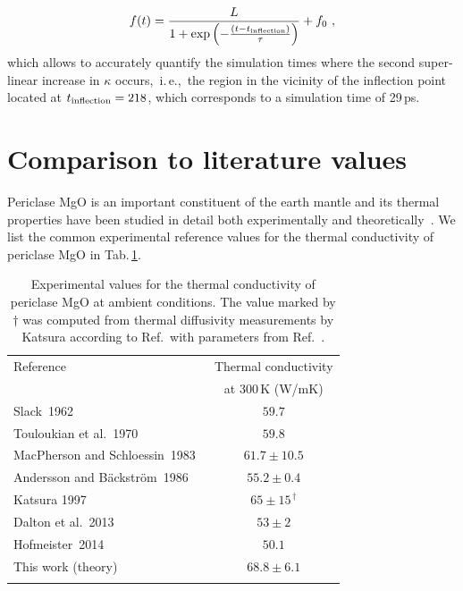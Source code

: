 \begin{align}
	f(t) 
		= \frac{L}{1 + \exp \left(-\frac{(t-t_{\rm inflection})}{\tau} \right)} + f_0~,
	\label{eq:imp.f_logistic}
\end{align}
which allows to accurately quantify the simulation times where the second super-linear increase in $\kappa$ occurs,~i.\,e.,~the region in the vicinity of the inflection point located at $t_{\rm inflection} = 218$, which corresponds to a simulation time of 29\,ps.

\section{Comparison to literature values}
\label{sec:mgo.experiments}
Periclase MgO is an important constituent of the earth mantle and its thermal properties have been studied in detail both experimentally and theoretically~\cite{Charvat.1957,Slack.1962,touloukian1970,Macpherson.1983,Koker.2009,Stackhouse.2010,Tang.2010,Dekura.2017}. We list the common experimental reference values for the thermal conductivity of periclase MgO in Tab.\,\ref{tab:exp.MgO}.
\begin{table}[ht]
  \centering
  \selectfont
  \begin{tabular}{lc}
    \toprule
    Reference & Thermal conductivity \\
    & at 300\,K (W/mK) \\
    \midrule
    Slack~1962~\cite{Slack.1962} & $59.7$ \\
    Touloukian et al.~1970~\cite{touloukian1970} & $59.8$ \\
    MacPherson and Schloessin~1983~\cite{Macpherson.1983} & $61.7 \pm 10.5$ \\
    Andersson and B\"ackstr\"om~1986~\cite{Andersson.1986} & $55.2 \pm 0.4$ \\
    Katsura 1997~\cite{Katsura.1997} & $65 \pm 15^{\,\dagger}$ \\
    Dalton et al.~2013~\cite{Dalton.2013} & $53 \pm 2$ \\
    Hofmeister~2014~\cite{Hofmeister.2014} & $50.1$ \\
    This work (theory) & $68.8 \pm 6.1$ \\
    \bottomrule
    \vspace{.5em}
  \end{tabular}
  \caption{Experimental values for the thermal conductivity of periclase MgO at ambient conditions. The value marked by $\dagger$ was computed from thermal diffusivity measurements by Katsura according to Ref.\,\cite{Hofmeister.2014} with parameters from Ref.~\cite{Dubrovinsky.1997,Chase.1998}.
  }
  \label{tab:exp.MgO}
\end{table}
